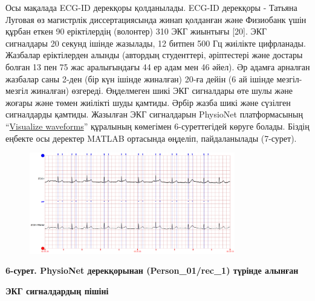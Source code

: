 {Осы мақалада ECG-ID дерекқоры қолданылады. ECG-ID дерекқоры - Татьяна
Луговая өз магистрлік диссертациясында жинап қолданған және Физиобанк
үшін құрбан еткен 90 еріктілердің (волонтер) 310 ЭКГ жиынтығы {[}20{]}.
ЭКГ сигналдары 20 секунд ішінде жазылады, 12 битпен 500 Гц жиілікте
цифрланады. Жазбалар еріктілерден алынды (автордың студенттері,
әріптестері және достары болған 13 пен 75 жас аралығындағы 44 ер адам
мен 46 әйел). Әр адамға арналған жазбалар саны 2-ден (бір күн ішінде
жиналған) 20-ға дейін (6 ай ішінде мезгіл-мезгіл жиналған) өзгереді.
Өңделмеген шикі ЭКГ сигналдары өте шулы және жоғары және төмен жиілікті
шуды қамтиды. Әрбір жазба шикі және сүзілген сигналдарды қамтиды.
Жазылған ЭКГ сигналдарын PhysioNet платформасының
``\href{https://physionet.org/lightwave/?db=ecgiddb/1.0.0}{Visualize
waveforms}'' құралының көмегімен 6-суреттегідей көруге болады. Біздің
еңбекте осы деректер MATLAB ортасында өңделіп, пайдаланылады (7-сурет).

\begin{figure}[H]
	\centering
	\includegraphics[width=0.8\textwidth]{media/ict/image45}
	\caption*{}
\end{figure}


{\bfseries 6-сурет. PhysioNet дерекқорынан (Person\_01/rec\_1) түрінде
алынған}

{\bfseries ЭКГ сигналдардың пішіні}

% 
% 

}
